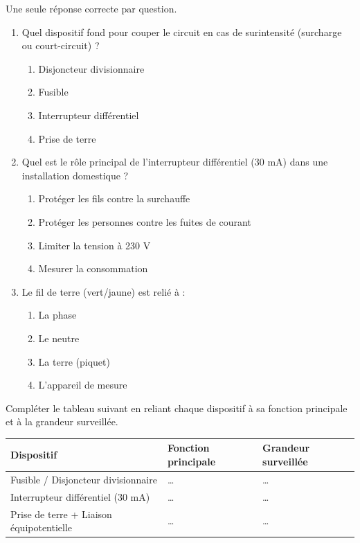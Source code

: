 \documentclass[11pt]{article}
\begin{document}
\begin{exercice}
Une seule réponse correcte par question.
\begin{enumerate}
    \item Quel dispositif fond pour couper le circuit en cas de surintensité (surcharge ou court-circuit) ?
    \begin{enumerate}
        \item Disjoncteur divisionnaire \item Fusible \item Interrupteur différentiel \item Prise de terre
    \end{enumerate}
    \item Quel est le rôle principal de l'interrupteur différentiel (30 mA) dans une installation domestique ?
    \begin{enumerate}
        \item Protéger les fils contre la surchauffe \item Protéger les personnes contre les fuites de courant \item Limiter la tension à 230 V \item Mesurer la consommation
    \end{enumerate}
    \item Le fil de terre (vert/jaune) est relié à :
    \begin{enumerate}
        \item La phase \item Le neutre \item La terre (piquet) \item L'appareil de mesure
    \end{enumerate}
\end{enumerate}
\end{exercice}

\begin{exercice}
Compléter le tableau suivant en reliant chaque dispositif à sa fonction principale et à la grandeur surveillée.

\begin{tabularx}{\linewidth}{|X|X|X|}
\hline
\textbf{Dispositif} & \textbf{Fonction principale} & \textbf{Grandeur surveillée} \\
\hline
Fusible / Disjoncteur divisionnaire & \ldots & \ldots \\
\hline
Interrupteur différentiel (30 mA) & \ldots & \ldots \\
\hline
Prise de terre + Liaison équipotentielle & \ldots & \ldots \\
\hline
\end{tabularx}
\end{exercice}
\end{document}

